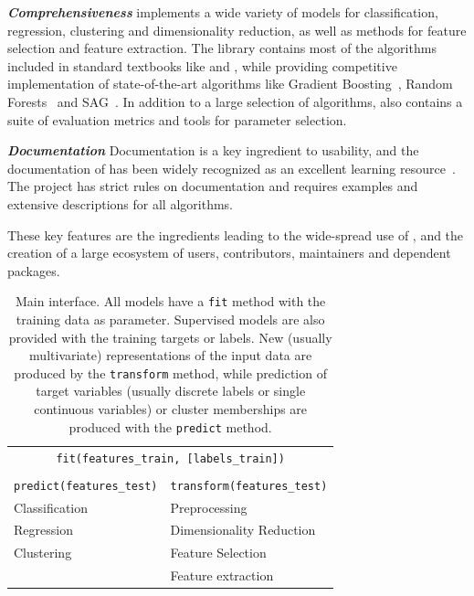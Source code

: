 \emph{\textbf{Comprehensiveness}} \sklearn{} implements a wide variety of models for classification,
regression, clustering and dimensionality reduction, as well as methods for feature
selection and feature extraction. The library contains most of the algorithms included
in standard textbooks like \textcite{bishop2001bishop} and
\textcite{friedman2001elements}, while providing competitive implementation of
state-of-the-art algorithms like Gradient
Boosting~\autocite{friedman2001greedy}, Random
Forests~\autocite{breiman2001random} and SAG~\autocite{roux2012stochastic}.  In
addition to a large selection of algorithms, \sklearn{} also contains a suite
of evaluation metrics and tools for parameter selection.

\emph{\textbf{Documentation}}
Documentation is a key ingredient to usability, and the documentation of \sklearn{}
has been widely recognized as an excellent learning
resource~\autocite{testimonials, benlorica, kdnuggetstopten, lovesklearn}. The
\sklearn{} project has strict rules on documentation and requires examples and
extensive descriptions for all algorithms.

These key features are the ingredients leading to the wide-spread use of
\sklearn{}, and the creation of a large ecosystem of users, contributors,
maintainers and dependent packages.

\begin{table}
    \caption{Main \sklearn interface. All models have a \texttt{fit} method
    with the training data as parameter. Supervised models are also provided
    with the training targets or labels. New (usually multivariate)
    representations of the input data are produced by the \texttt{transform}
    method, while prediction of target variables (usually discrete labels or
    single continuous variables) or cluster memberships are produced with the
    \texttt{predict} method.
}
\begin{center}
    \begin{tabular}{p{} p{}}
    \multicolumn{2}{c}{\texttt{fit(features\_train, [labels\_train])}}\\\\
    \texttt{predict(features\_test)} & \texttt{transform(features\_test)}\\
    \cmidrule[1pt](r{1em}){1-1} \cmidrule[1pt](l){2-2}
    Classification & Preprocessing\\
    Regression & Dimensionality Reduction\\
    Clustering & Feature Selection\\
               & Feature extraction\\
\end{tabular}
\end{center}
\end{table}

